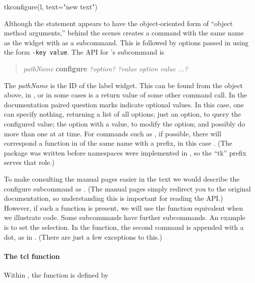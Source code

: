 \begin{Schunk}
\begin{Sinput}
 tkconfigure(l, text="new text")
\end{Sinput}
\end{Schunk}


Although the \TCL\/ statement appears to have the object-oriented form
of ``object method arguments,'' behind the scenes \TCL\/ creates a
command with the same name as the widget with  as a
subcommand. This is followed by options passed in using the form
\texttt{-key value}.  The \TK\/ API for 's
 subcommand is

\begin{quotation}
  \textit{pathName} \textbf{configure} \textit{?option? ?value option value ...?}
\end{quotation}

The \textit{pathName} is the ID of the label widget. This can be found
from the object  above, in , or in some cases is a
return value of some other command call.  In the \TK\/ documentation
paired question marks indicate optional values. In this case, one can
specify nothing, returning a list of all options; just an option, to
query the configured value; the option with a value, to modify the
option; and possibly do more than one at at time.  For commands such
as , if possible, there will correspond a function in
\R\/ of the same name with a  prefix, in this case
.  (The package  was written before
namespaces were implemented in \R, so the ``tk'' prefix serves that role.) 

To make consulting the \TK\/ manual pages easier in the text we would
describe the configure subcommand as
. (The \R\/ manual pages
simply redirect you to the original \TK\/ documentation, so
understanding this is important for reading the API.) However, if such
a function is present, we will use the \R\/ function equivalent when
we illustrate code. Some subcommands have further subcommands. An
example is to set the selection. In the \R\/ function, the second
command is appended with a dot, as in . (There
are just a few exceptions to this.)

\paragraph{The tcl function} Within , the  function is defined by


